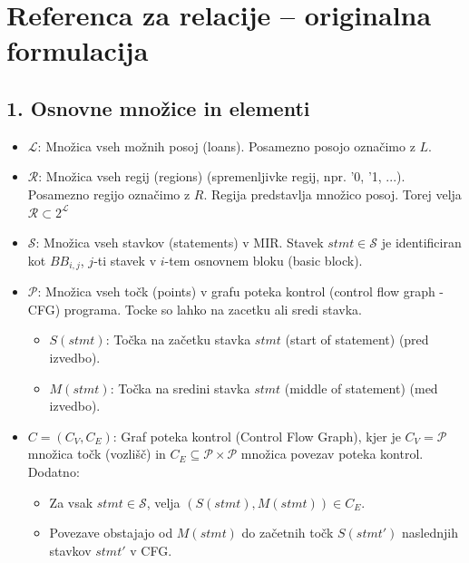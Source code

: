 \documentclass{article}
\begin{document}
\section*{Referenca za relacije -- originalna formulacija}

\subsection*{1. Osnovne množice in elementi}
\begin{itemize}
	\item $\mathcal{L}$: Množica vseh možnih posoj (loans). Posamezno posojo označimo z $L$.
	\item $\mathcal{R}$: Množica vseh regij (regions) (spremenljivke regij, npr. '0, '1, ...). Posamezno regijo označimo z $R$. Regija predstavlja množico posoj. Torej velja $\mathcal{R} \subset 2^{\mathcal{L}}$
	\item $\mathcal{S}$: Množica vseh stavkov (statements) v MIR. Stavek $stmt \in \mathcal{S}$ je identificiran kot $BB_{i,j}$, $j$-ti stavek v $i$-tem osnovnem bloku (basic block).
	\item $\mathcal{P}$: Množica vseh točk (points) v grafu poteka kontrol (control flow graph - CFG) programa. Tocke so lahko na zacetku ali sredi stavka.
	      \begin{itemize}
		      \item $S(stmt)$: Točka na začetku stavka $stmt$ (start of statement) (pred izvedbo).
		      \item $M(stmt)$: Točka na sredini stavka $stmt$ (middle of statement) (med izvedbo).
	      \end{itemize}
	\item $C = (C_V, C_E)$: Graf poteka kontrol (Control Flow Graph), kjer je $C_V = \mathcal{P}$ množica točk (vozlišč) in $C_E \subseteq \mathcal{P} \times \mathcal{P}$ množica povezav poteka kontrol. Dodatno:
	      \begin{itemize}
		      \item Za vsak $stmt \in \mathcal{S}$, velja $(S(stmt), M(stmt)) \in C_E$.
		      \item Povezave obstajajo od $M(stmt)$ do začetnih točk $S(stmt')$ naslednjih stavkov $stmt'$ v CFG.
	      \end{itemize}
\end{itemize}
\end{document}
